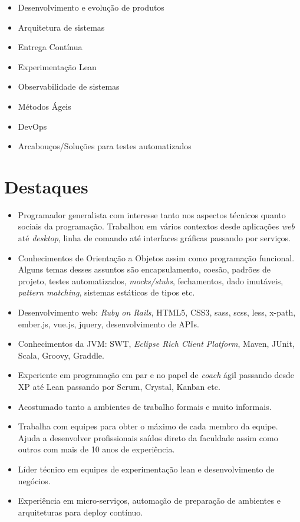 \documentclass[letter,10pt]{article}
\begin{document}
\begin{itemize}
\item Desenvolvimento e evolução de produtos
\item Arquitetura de sistemas
\item Entrega Contínua
\item Experimentação Lean
\item Observabilidade de sistemas
\item Métodos Ágeis
\item DevOps
\item Arcabouços/Soluções para testes automatizados
\end{itemize}

\section{Destaques}

\begin{itemize}
\item Programador generalista com interesse tanto nos aspectos
  técnicos quanto sociais da programação. Trabalhou em vários contextos desde aplicações \textit{web} até \textit{desktop}, linha de comando até interfaces
  gráficas passando por serviços.
\item Conhecimentos de Orientação a Objetos assim como programação funcional. Alguns temas desses assuntos são encapsulamento, coesão, padrões de projeto,  testes automatizados, \textit{mocks/stubs}, fechamentos, dado imutáveis, \textit{pattern matching}, sistemas estáticos de tipos etc.
\item Desenvolvimento web: \textit{Ruby on Rails}, HTML5, CSS3, sass, scss, less, x-path, ember.js, vue.js, jquery, desenvolvimento de APIs.
\item Conhecimentos da JVM: SWT, \textit{Eclipse Rich Client Platform}, Maven, JUnit, Scala, Groovy, Graddle.
\item Experiente em programação em par e no papel de \textit{coach}
  ágil passando desde XP até Lean passando por Scrum, Crystal, Kanban etc.
\item Acostumado tanto a ambientes de trabalho formais e muito
  informais.
\item Trabalha com equipes para obter o máximo de cada membro da equipe. Ajuda a desenvolver profissionais saídos direto da faculdade assim como outros com mais de 10 anos de experiência.
\item Líder técnico em equipes de experimentação lean e desenvolvimento de negócios.
\item Experiência em micro-serviços, automação de preparação de ambientes e arquiteturas para deploy contínuo.
\end{itemize}
\end{document}

